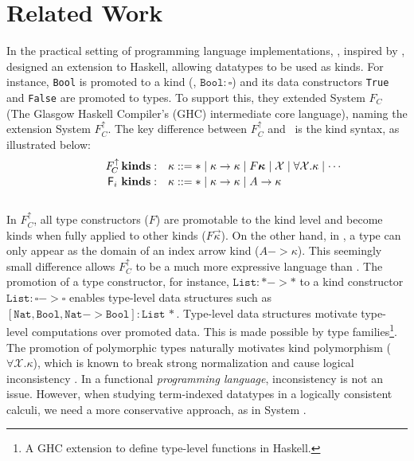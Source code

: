 \section{Related Work} \label{sec:relwork}

In the practical setting of programming language implementations,
\citet{YorgeyWCJVM12}, inspired by \citet{SHE}, designed an extension
to Haskell, allowing datatypes to be used as kinds. For instance, \texttt{Bool}
is promoted to a kind (\ie, $\texttt{Bool}:\square$) and its data constructors
\texttt{True} and \texttt{False} are promoted to types. To support this,
they extended System $F_{\!C}$ (The Glasgow Haskell Compiler's (GHC) intermediate core language), 
naming the extension System $F_{\!C}^\uparrow$.
The key difference between $F_{\!C}^\uparrow$ and \Fi\ is the kind syntax, as illustrated below: \vspace*{-2pt}
\[\qquad\quad
\begin{array}{ll}
F_{\!C}^\uparrow\,\textbf{kinds}: &
\kappa ::= * \mid \kappa -> \kappa \mid F \vec{\kappa} \mid \mathcal{X} \mid \forall \mathcal{X}.\kappa \mid \cdots \\
\,\Fi\,\,\textbf{kinds}: &
\kappa ::= * \mid \kappa -> \kappa \mid A -> \kappa \phantom{A^{A^A}}
\end{array}  
\] ~\vspace*{-6pt}\\
In $F_{\!C}^\uparrow$, all type constructors ($F$) are promotable to the 
kind level and become kinds when fully applied to other kinds
($F\vec\kappa$). On the other hand, in \Fi,  a type can only appear
as the domain of an index arrow kind ($A-> \kappa$). This seemingly small
difference allows $F_{\!C}^\uparrow$ to be a much
more expressive language than \Fi. The promotion of
a type constructor, for instance, $\texttt{List}:* -> *$ to a kind constructor
$\texttt{List}:\square-> \square$ enables type-level data structures
such as $\mathtt{[Nat,Bool,Nat-> Bool]:List\,*}$. Type-level
data structures motivate type-level computations over promoted data.
This is made possible by type families\footnote{
	A GHC extension to define type-level functions in Haskell.}.
The promotion of polymorphic types naturally motivates
kind polymorphism ($\forall \mathcal{X}.\kappa$), which is known to
break strong normalization and cause logical inconsistency \cite{Girard72}.
In a functional {\em programming language},
inconsistency is not an issue. However, when studying
term-indexed datatypes in a logically consistent calculi, we need
a more conservative approach, as in System \Fi.

